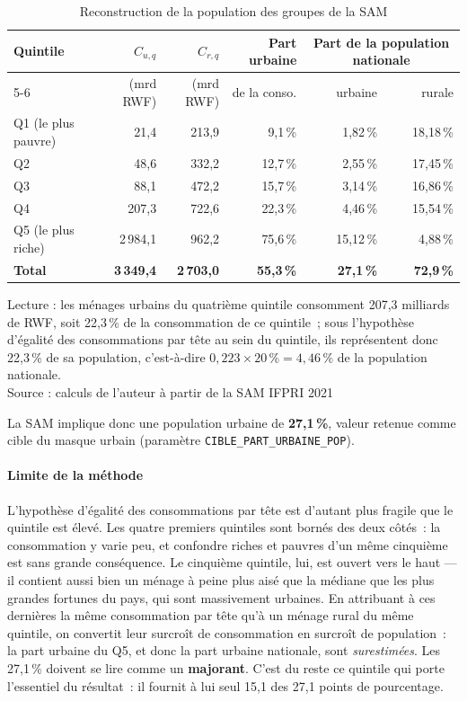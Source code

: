 \documentclass[12pt,a4paper,french]{report}
\begin{document}
		\begin{table}[H]
			\centering
			\caption{Reconstruction de la population des groupes de la SAM}
			\label{tab:part_urbaine_sam}
			\begin{tabular}{lrrrrr}
				\toprule
				Quintile & $C_{u,q}$ & $C_{r,q}$ & Part urbaine & \multicolumn{2}{c}{Part de la population nationale} \\
				\cmidrule(lr){5-6}
				& (mrd RWF) & (mrd RWF) & de la conso. & urbaine & rurale \\
				\midrule
				Q1 (le plus pauvre) &    21,4 &   213,9 &  9,1\,\% &  1,82\,\% & 18,18\,\% \\
				Q2                  &    48,6 &   332,2 & 12,7\,\% &  2,55\,\% & 17,45\,\% \\
				Q3                  &    88,1 &   472,2 & 15,7\,\% &  3,14\,\% & 16,86\,\% \\
				Q4                  &   207,3 &   722,6 & 22,3\,\% &  4,46\,\% & 15,54\,\% \\
				Q5 (le plus riche)  & 2\,984,1 &   962,2 & 75,6\,\% & 15,12\,\% &  4,88\,\% \\
				\midrule
				\textbf{Total}      & \textbf{3\,349,4} & \textbf{2\,703,0} & \textbf{55,3\,\%} & \textbf{27,1\,\%} & \textbf{72,9\,\%} \\
				\bottomrule
			\end{tabular}

			\vspace{0.3em}
			{\footnotesize Lecture : les ménages urbains du quatrième quintile consomment 207,3 milliards de RWF, soit 22,3\,\% de la consommation de ce quintile~; sous l'hypothèse d'égalité des consommations par tête au sein du quintile, ils représentent donc 22,3\,\% de sa population, c'est-à-dire $0{,}223 \times 20\,\% = 4{,}46\,\%$ de la population nationale. \\ Source : calculs de l'auteur à partir de la SAM IFPRI 2021}
		\end{table}

		La SAM implique donc une population urbaine de \textbf{27,1\,\%}, valeur retenue comme cible du masque urbain (paramètre \texttt{CIBLE\_PART\_URBAINE\_POP}).

		\paragraph{Limite de la méthode}
		L'hypothèse d'égalité des consommations par tête est d'autant plus fragile que le quintile est élevé. Les quatre premiers quintiles sont bornés des deux côtés~: la consommation y varie peu, et confondre riches et pauvres d'un même cinquième est sans grande conséquence. Le cinquième quintile, lui, est ouvert vers le haut — il contient aussi bien un ménage à peine plus aisé que la médiane que les plus grandes fortunes du pays, qui sont massivement urbaines. En attribuant à ces dernières la même consommation par tête qu'à un ménage rural du même quintile, on convertit leur surcroît de consommation en surcroît de population~: la part urbaine du Q5, et donc la part urbaine nationale, sont \emph{surestimées}. Les 27,1\,\% doivent se lire comme un \textbf{majorant}. C'est du reste ce quintile qui porte l'essentiel du résultat~: il fournit à lui seul 15,1 des 27,1 points de pourcentage.
\end{document}
